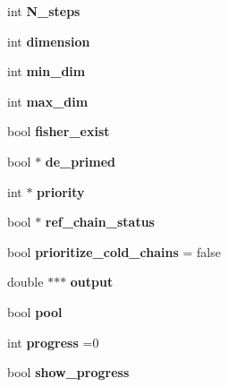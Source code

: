 \begin{DoxyCompactItemize}
\mbox{\label{classsampler_ad99bec294257a8e22b14091a403c5e41}} 
int {\bfseries N\+\_\+steps}
\item 
\mbox{\label{classsampler_aefce952ae3d54283ed05035cc7bb094d}} 
int {\bfseries dimension}
\item 
\mbox{\label{classsampler_a26e43b6bc36c13a166bf6ae97bb2eac1}} 
int {\bfseries min\+\_\+dim}
\item 
\mbox{\label{classsampler_ac377db38549868c3971029bcb071bb98}} 
int {\bfseries max\+\_\+dim}
\item 
\mbox{\label{classsampler_a6b85548a4adacf726b317954111aa681}} 
bool {\bfseries fisher\+\_\+exist}
\item 
\mbox{\label{classsampler_acd39963f4ab1bc2730c1dc13cfc1869e}} 
bool $\ast$ {\bfseries de\+\_\+primed}
\item 
\mbox{\label{classsampler_a94d70e8841cb2472895f5c275b70024f}} 
int $\ast$ {\bfseries priority}
\item 
\mbox{\label{classsampler_a6eb7e7801369e67ebc59bd1c97ce1c6c}} 
bool $\ast$ {\bfseries ref\+\_\+chain\+\_\+status}
\item 
\mbox{\label{classsampler_ac82b14511b477b6fb3f1031fd3eb8e6d}} 
bool {\bfseries prioritize\+\_\+cold\+\_\+chains} = false
\item 
\mbox{\label{classsampler_aa751bde85363017a9cc66c5367c755d1}} 
double $\ast$$\ast$$\ast$ {\bfseries output}
\item 
\mbox{\label{classsampler_aa674666a7515ce0853734e1337ffd402}} 
bool {\bfseries pool}
\item 
\mbox{\label{classsampler_af248578ba42f306ff0d9d1e47a75c055}} 
int {\bfseries progress} =0
\item 
\mbox{\label{classsampler_a52a0fb22a7c5c9a1c875b0c09efc467b}} 
bool {\bfseries show\+\_\+progress}

\end{DoxyCompactItemize}
